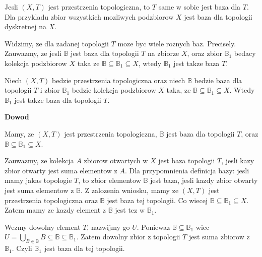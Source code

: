 \documentclass{article}
\begin{document}
\begin{tcolorbox}[colback=white!90!green,colframe=black!35!green,title=2.2.6 Lematokomentarz: Rozne bazy dla tej samej topologii]

    Jesli $(X,T)$ jest przestrzenia topologiczna, to $T$ same w sobie jest baza dla $T$. Dla przykladu zbior wszystkich mozliwych podzbiorow $X$ jest baza dla topologii dyskretnej na $X$.

    Widzimy, ze dla zadanej topologii $T$ moze byc wiele roznych baz. Precisely. Zauwazmy, ze jesli $\mathbb{B}$ jest baza dla topologii $T$ na zbiorze $X$, oraz zbior $\mathbb{B}_{1}$ bedacy kolekcja podzbiorow $X$ taka ze $\mathbb{B} \subseteq \mathbb{B}_{1} \subseteq X$, wtedy $\mathbb{B}_{1}$ jest takze baza $T$.

\end{tcolorbox}

\begin{tcolorbox}[colback=white!90!blue,colframe=black!35!blue,title=Wniosek 2.2.6.1. Nadzbior bazy]

    Niech $(X,T)$ bedzie przestrzenia topologiczna oraz niech $\mathbb{B}$ bedzie baza dla topologii $T$ i zbior $\mathbb{B}_{1}$ bedzie kolekcja podzbiorow $X$ taka, ze $\mathbb{B} \subseteq \mathbb{B}_{1} \subseteq X$. Wtedy $\mathbb{B}_{1}$ jest takze baza dla topologii $T$.

\end{tcolorbox}

\textbf{Dowod}

Mamy, ze $(X,T)$ jest przestrzenia topologiczna, $\mathbb{B}$ jest baza dla topologii $T$, oraz $\mathbb{B} \subseteq \mathbb{B}_{1} \subseteq X$. 

Zauwazmy, ze kolekcja $A$ zbiorow otwartych w $X$ jest baza topologii $T$, jesli kazy zbior otwarty jest suma elementow z $A$. Dla przypomnienia definicja bazy: jesli mamy jakas topologie $T$, to zbior elementow $\mathbb{B}$ jest baza, jesli kazdy zbior otwarty jest suma elementow z $\mathbb{B}$.  Z zalozenia wniosku, mamy ze $(X,T)$ jest przestrzenia topologiczna oraz $\mathbb{B}$ jest baza tej topologii. Co wiecej $\mathbb{B} \subseteq \mathbb{B}_{1} \subseteq X$. Zatem mamy ze kazdy element z $\mathbb{B}$ jest tez w $\mathbb{B}_{1}$.

Wezmy dowolny element $T$, nazwijmy go $U$. Poniewaz $\mathbb{B} \subseteq \mathbb{B}_{1}$ wiec $U = \bigcup\limits_{B \in \mathbb{B}}B \subseteq \mathbb{B} \subseteq \mathbb{B}_{1}$. Zatem dowolny zbior z topologii $T$ jest suma zbiorow z $\mathbb{B}_{1}$. Czyli $\mathbb{B}_{1}$ jest baza dla tej topologii.
\end{document}
